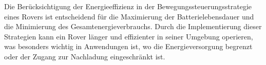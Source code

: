 \documentclass{vorlage-design-main}
\begin{document}
Die Berücksichtigung der Energieeffizienz in der
Bewegungssteuerungsstrategie eines Rovers ist entscheidend für die
Maximierung der Batterielebensdauer und die Minimierung des
Gesamtenergieverbrauchs. Durch die Implementierung dieser Strategien
kann ein Rover länger und effizienter in seiner Umgebung operieren, was
besonders wichtig in Anwendungen ist, wo die Energieversorgung begrenzt
oder der Zugang zur Nachladung eingeschränkt ist. %


\clearpage
\printbibliography
\end{document}
